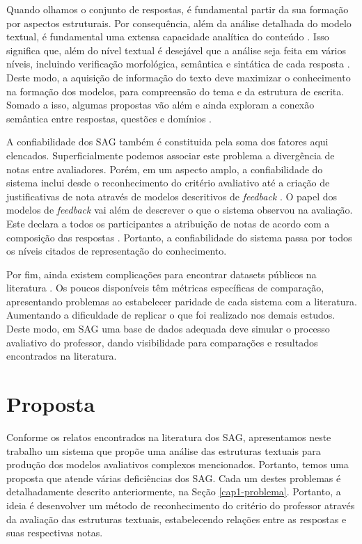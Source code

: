 Quando olhamos o conjunto de respostas, é fundamental partir da sua formação por aspectos estruturais. Por consequência, além da análise detalhada do modelo textual, é fundamental uma extensa capacidade analítica do conteúdo \cite{saha2018}. Isso significa que, além do nível textual é desejável que a análise seja feita em vários níveis, incluindo verificação morfológica, semântica e sintática de cada resposta \cite{sakaguchi2015, riordan2019, sahu2020}. Deste modo, a aquisição de informação do texto deve maximizar o conhecimento na formação dos modelos, para compreensão do tema e da estrutura de escrita. Somado a isso, algumas propostas vão além e ainda exploram a conexão semântica entre respostas, questões e domínios \cite{dzikovska2013, saha2019}.

A confiabilidade dos SAG também é constituida pela soma dos fatores aqui elencados. Superficialmente podemos associar este problema a divergência de notas entre avaliadores. Porém, em um aspecto amplo, a confiabilidade do sistema inclui desde o reconhecimento do critério avaliativo até a criação de justificativas de nota através de modelos descritivos de \textit{feedback} \cite{kumar2019}. O papel dos modelos de \textit{feedback} vai além de descrever o que o sistema observou na avaliação. Este declara a todos os participantes a atribuição de notas de acordo com a composição das respostas \cite{marvaniya2018, bernius2022}. Portanto, a confiabilidade do sistema passa por todos os níveis citados de representação do conhecimento.

Por fim, ainda existem complicações para encontrar datasets públicos na literatura \cite{burrows2015}. Os poucos disponíveis têm métricas específicas de comparação, apresentando problemas ao estabelecer paridade de cada sistema com a literatura. Aumentando a dificuldade de replicar o que foi realizado nos demais estudos. Deste modo, em SAG uma base de dados adequada deve simular o processo avaliativo do professor, dando visibilidade para comparações e resultados encontrados na literatura.


\section{Proposta}
\label{cap1-proposta}

Conforme os relatos encontrados na literatura dos SAG, apresentamos neste trabalho um sistema que propõe uma análise das estruturas textuais para produção dos modelos avaliativos complexos mencionados. Portanto, temos uma proposta que atende várias deficiências dos SAG. Cada um destes problemas é detalhadamente descrito anteriormente, na Seção \ref{cap1-problema}. Portanto, a ideia é desenvolver um método de reconhecimento do critério do professor através da avaliação das estruturas textuais, estabelecendo relações entre as respostas e suas respectivas notas.

